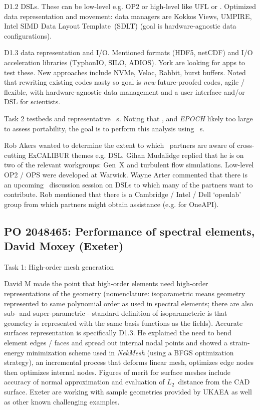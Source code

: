 D1.2 DSLs.  These can be low-level e.g. OP2 or high-level like UFL or . 
Optimized data representation and movement: data managers are Kokkos 
Views, UMPIRE, Intel SIMD Data Layout Template~(SDLT)
(goal is hardware-agnostic data configurations).

D1.3 data representation and I/O.  Mentioned formats (HDF5, netCDF) and 
I/O acceleration libraries (TyphonIO, SILO, ADIOS).  York are looking for apps 
to test these.  New approaches include NVMe, Veloc, Rabbit, burst buffers.  
Noted that rewriting existing codes nasty so goal is \emph{new} future-proofed codes, 
agile / flexible, with hardware-agnostic data management and a user interface 
and/or DSL for scientists.

Task 2 testbeds and representative \papp\ s.  Noting that ,
 and {\it EPOCH} likely too large to assess portability, the goal is to 
perform this analysis using \papp\ s.


Rob Akers wanted to determine the extent to which \nep\  partners are aware of 
cross-cutting ExCALIBUR themes e.g. DSL.  Gihan Mudalidge replied that he is on 
two of the relevant workgroups: Gen~X and turbulent flow simulations.
Low-level OP2 / OPS were developed at Warwick.  Wayne Arter commented 
that there is an upcoming \nep\  discussion session on DSLs to which many of 
the partners want to contribute.  Rob mentioned that there is a Cambridge / 
Intel / Dell `openlab' group from which partners might obtain assistance (e.g. 
for OneAPI).

\subsection{PO 2048465: Performance of spectral elements, David Moxey (Exeter)}

Task 1: High-order mesh generation

David M made the point that high-order elements need high-order representations 
of the geometry (nomenclature: isoparametric means geometry represented to same 
polynomial order as used in spectral elements; there are also sub- and 
super-parametric - standard definition of isoparameteric is that geometry is represented
with the same basis functions as the fields).
Accurate surfaces representation is specifically D1.3.  He 
explained the need to bend element edges / faces and spread out internal nodal 
points and showed a strain-energy minimization scheme used in {\it NekMesh} 
(using a BFGS optimization strategy), an incremental process that deforms 
linear mesh, optimizes edge nodes then optimizes internal nodes.  Figures of 
merit for surface meshes include accuracy of normal approximation and 
evaluation of $L_2$~distance from the CAD surface.  Exeter are working with 
sample geometries provided by UKAEA as well as other known challenging examples.

